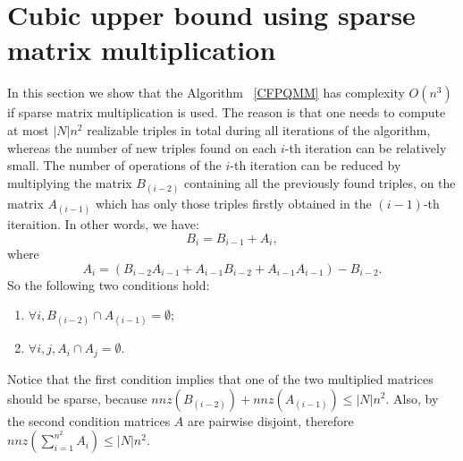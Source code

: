 \section{Cubic upper bound using sparse matrix multiplication}
In this section we show that the Algorithm ~\ref{CFPQMM} has complexity $O(n^3)$ if sparse matrix multiplication is used. The reason is that one needs to compute at most $|N|n^2$ realizable triples in total during all iterations of the algorithm, whereas the number of new triples found on each $i$-th iteration can be relatively small. The number of operations of the $i$-th iteration can be reduced by multiplying the matrix $B_{(i-2)}$ containing all the previously found triples, on the matrix $A_{(i-1)}$ which has only those triples firstly obtained in the $(i-1)$-th iteraition. In other words, we have:
\begin{equation}
\label{Bi}
B_i = B_{i-1} + A_i, 
\end{equation}
where
\begin{equation}
\label{Ai}
A_i = (B_{i-2}A_{i-1} + A_{i-1}B_{i-2} + A_{i-1}A_{i-1}) - B_{i-2}.
\end{equation}
So the following two conditions hold:
\begin{enumerate}
\item $\forall i, B_{(i-2)} \cap A_{(i-1)} = \emptyset$;
\item $\forall i, j,  A_i \cap A_j = \emptyset$.
\end{enumerate}
Notice that the first condition implies that one of the two multiplied matrices should be sparse, because $nnz(B_{(i-2)}) + nnz(A_{(i-1)}) \le |N|n^2$. Also, by the second condition matrices $A$ are pairwise disjoint, therefore $nnz(\sum\limits_{i=1}^{n^2}{A_i}) \le |N|n^2$. 


